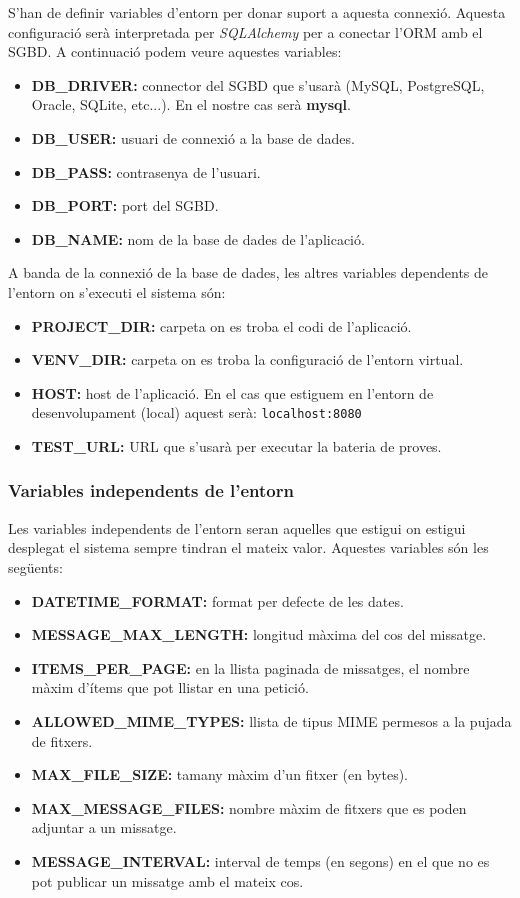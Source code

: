 S'han de definir variables d'entorn per donar suport a aquesta connexió. Aquesta configuració serà interpretada per \emph{SQLAlchemy} per a conectar l'\ac{ORM} amb el \ac{SGBD}. A continuació podem veure aquestes variables:

\begin{itemize}
	\item \textbf{DB\_DRIVER:} connector del \ac{SGBD} que s'usarà (MySQL, PostgreSQL, Oracle, SQLite, etc...). En el nostre cas serà \textbf{mysql}.
	\item \textbf{DB\_USER:} usuari de connexió a la base de dades.
	\item \textbf{DB\_PASS:} contrasenya de l'usuari.
	\item \textbf{DB\_PORT:} port del \ac{SGBD}.
	\item \textbf{DB\_NAME:} nom de la base de dades de l'aplicació.
\end{itemize}

A banda de la connexió de la base de dades, les altres variables dependents de l'entorn on s'executi el sistema són:
\begin{itemize}
	\item \textbf{PROJECT\_DIR:} carpeta on es troba el codi de l'aplicació.
	\item \textbf{VENV\_DIR:} carpeta on es troba la configuració de l'entorn virtual.
	\item \textbf{HOST:} host de l'aplicació. En el cas que estiguem en l'entorn de desenvolupament (local) aquest serà: \texttt{localhost:8080}
	\item \textbf{TEST\_URL:} \ac{URL} que s'usarà per executar la bateria de proves.
\end{itemize}

\subsubsection{Variables independents de l'entorn}
Les variables independents de l'entorn seran aquelles que estigui on estigui desplegat el sistema sempre tindran el mateix valor. Aquestes variables són les següents:

\begin{itemize}	
	
	\item \textbf{DATETIME\_FORMAT:} format per defecte de les dates. 
	\item \textbf{MESSAGE\_MAX\_LENGTH:} longitud màxima del cos del missatge.
	\item \textbf{ITEMS\_PER\_PAGE:} en la llista paginada de missatges, el nombre màxim d'ítems que pot llistar en una petició.
	\item \textbf{ALLOWED\_MIME\_TYPES:} llista de tipus \ac{MIME} permesos a la pujada de fitxers.
	\item \textbf{MAX\_FILE\_SIZE:} tamany màxim d'un fitxer (en bytes).
	\item \textbf{MAX\_MESSAGE\_FILES:} nombre màxim de fitxers que es poden adjuntar a un missatge.
	\item \textbf{MESSAGE\_INTERVAL:} interval de temps (en segons) en el que no es pot publicar un missatge amb el mateix cos.
\end{itemize}

